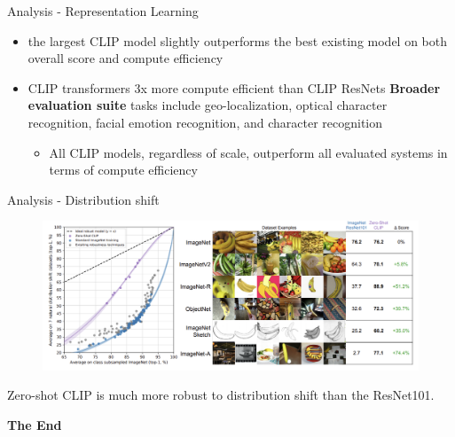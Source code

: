 \documentclass[aspectratio=169,xcolor=dvipsnames]{beamer}
\begin{document}

\begin{frame}{Analysis - Representation Learning}
    \begin{itemize}
        \item the largest CLIP model slightly outperforms the best existing model on both overall score and compute efficiency
        \item CLIP transformers 3x more compute efficient than CLIP ResNets
        \bigskip
        \textbf{Broader evaluation suite} tasks include geo-localization, optical character recognition, facial emotion recognition, and character recognition
        \begin{itemize}
            \item All CLIP models, regardless of scale, outperform all evaluated systems in terms of compute efficiency
        \end{itemize}
    \end{itemize}
\end{frame}


\begin{frame}{Analysis -  Distribution shift}
    \begin{figure}
        \centering
        \includegraphics[width=0.75 \linewidth]{figures/distribution_shift.png}
        \label{distribution_shift}
    \end{figure}   
    Zero-shot CLIP is much more robust to distribution shift than the ResNet101.\\
\end{frame}


\begin{frame}
    \Huge{\centerline{\textbf{The End}}}
\end{frame}

\end{document}

